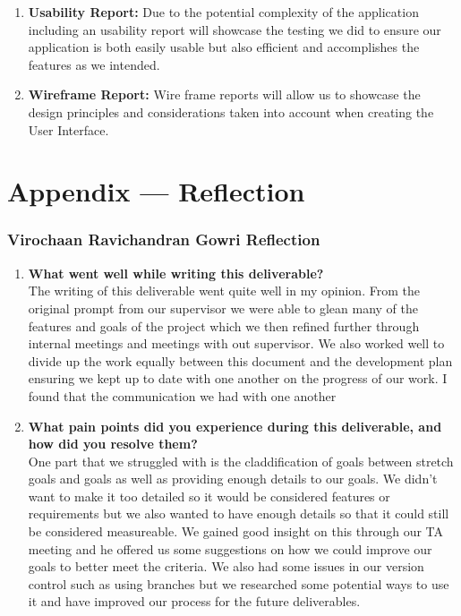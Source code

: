 \documentclass{article}
\begin{document}
\begin{enumerate}
    \item \textbf{Usability Report:} Due to the potential complexity of the application including an usability report will showcase the testing we did to ensure our application is both easily usable but also efficient and accomplishes the features as we intended.
    \item \textbf{Wireframe Report:} Wire frame reports will allow us to showcase the design principles and considerations taken into account when creating the User Interface.
\end{enumerate} 

\newpage{}

\section*{Appendix --- Reflection}


\subsubsection*{Virochaan Ravichandran Gowri Reflection}
\begin{enumerate}
    \item \textbf{What went well while writing this deliverable? } \\
    The writing of this deliverable went quite well in my opinion. From the original prompt from our supervisor we were able to glean many of the features and goals of the project which we then refined further through internal meetings and meetings with out supervisor. We also worked well to divide up the work equally between this document and the development plan ensuring we kept up to date with one another on the progress of our work. I found that the communication we had with one another 
    \item \textbf{What pain points did you experience during this deliverable, and how did you resolve them?} \\ 
    One part that we struggled with is the claddification of goals between stretch goals and goals as well as providing enough details to our goals. We didn't want to make it too detailed so it would be considered features or requirements but we also wanted to have enough details so that it could still be considered measureable. We gained good insight on this through our TA meeting and he offered us some suggestions on how we could improve our goals to better meet the criteria. We also had some issues in our version control such as using branches but we researched some potential ways to use it and have improved our process for the future deliverables.
    
\end{enumerate} 
\end{document}
